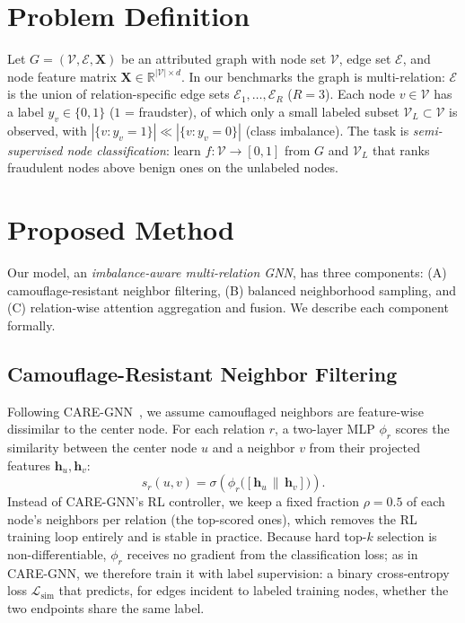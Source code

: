 \documentclass[conference]{IEEEtran}
\begin{document}
\section{Problem Definition}
Let $G = (\mathcal{V}, \mathcal{E}, \mathbf{X})$ be an attributed graph with
node set $\mathcal{V}$, edge set $\mathcal{E}$, and node feature matrix
$\mathbf{X} \in \mathbb{R}^{|\mathcal{V}| \times d}$. In our benchmarks the
graph is multi-relation: $\mathcal{E}$ is the union of relation-specific
edge sets $\mathcal{E}_1, \dots, \mathcal{E}_R$ ($R = 3$). Each node
$v \in \mathcal{V}$ has a label $y_v \in \{0, 1\}$ ($1$ = fraudster), of which
only a small labeled subset $\mathcal{V}_L \subset \mathcal{V}$ is observed,
with $|\{v : y_v = 1\}| \ll |\{v : y_v = 0\}|$ (class imbalance). The task is
\emph{semi-supervised node classification}: learn
$f : \mathcal{V} \rightarrow [0, 1]$ from $G$ and $\mathcal{V}_L$ that ranks
fraudulent nodes above benign ones on the unlabeled nodes.

\section{Proposed Method}
Our model, an \emph{imbalance-aware multi-relation GNN}, has three
components: (A) camouflage-resistant neighbor filtering, (B) balanced
neighborhood sampling, and (C) relation-wise attention aggregation and
fusion. We describe each component formally.

\subsection{Camouflage-Resistant Neighbor Filtering}
Following CARE-GNN~\cite{DBLP:conf/cikm/DouL0DPY20}, we assume camouflaged
neighbors are feature-wise dissimilar to the center node. For each relation
$r$, a two-layer MLP $\phi_r$ scores the similarity between the center node
$u$ and a neighbor $v$ from their projected features
$\mathbf{h}_u, \mathbf{h}_v$:
\begin{equation}
s_r(u, v) = \sigma\!\left(\phi_r\big([\mathbf{h}_u \,\|\, \mathbf{h}_v]\big)\right).
\end{equation}
Instead of CARE-GNN's RL controller, we keep a fixed fraction $\rho = 0.5$
of each node's neighbors per relation (the top-scored ones), which removes
the RL training loop entirely and is stable in practice. Because hard top-$k$
selection is non-differentiable, $\phi_r$ receives no gradient from the
classification loss; as in CARE-GNN, we therefore train it with label
supervision: a binary cross-entropy loss $\mathcal{L}_{\text{sim}}$ that
predicts, for edges incident to labeled training nodes, whether the two
endpoints share the same label.
\end{document}
